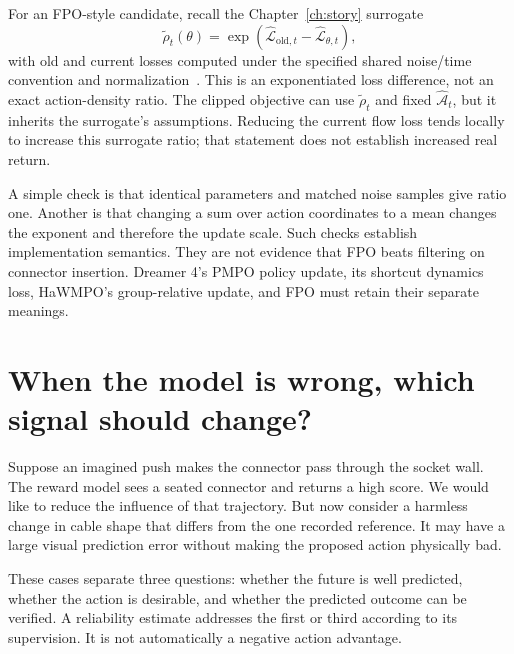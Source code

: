 For an FPO-style candidate, recall the Chapter~\ref{ch:story} surrogate
\begin{equation}
 \tilde\rho_t(\theta)=\exp\left(\widehat{\mathcal L}_{\mathrm{old},t}
                              -\widehat{\mathcal L}_{\theta,t}\right),
 \label{eq:middle-fpo}
\end{equation}
with old and current losses computed under the specified shared noise/time convention and normalization~\citep{fpo}. This is an exponentiated loss difference, not an exact action-density ratio. The clipped objective can use $\tilde\rho_t$ and fixed $\widehat{\mathcal A}_t$, but it inherits the surrogate's assumptions. Reducing the current flow loss tends locally to increase this surrogate ratio; that statement does not establish increased real return.

A simple check is that identical parameters and matched noise samples give ratio one. Another is that changing a sum over action coordinates to a mean changes the exponent and therefore the update scale. Such checks establish implementation semantics. They are not evidence that FPO beats filtering on connector insertion. Dreamer 4's PMPO policy update, its shortcut dynamics loss, HaWMPO's group-relative update, and FPO must retain their separate meanings.

\section{When the model is wrong, which signal should change?}
Suppose an imagined push makes the connector pass through the socket wall. The reward model sees a seated connector and returns a high score. We would like to reduce the influence of that trajectory. But now consider a harmless change in cable shape that differs from the one recorded reference. It may have a large visual prediction error without making the proposed action physically bad.

These cases separate three questions: whether the future is well predicted, whether the action is desirable, and whether the predicted outcome can be verified. A reliability estimate addresses the first or third according to its supervision. It is not automatically a negative action advantage.


